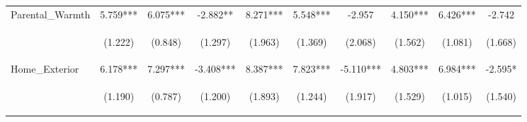 \begin{tabular}{lccccccccc}
\noalign{\smallskip}Parental_Warmth & 5.759*** & 6.075*** & -2.882** & 8.271*** & 5.548*** & -2.957 & 4.150*** & 6.426*** & -2.742\\
 & \begin{footnotesize}(1.222)\end{footnotesize} & \begin{footnotesize}(0.848)\end{footnotesize} & \begin{footnotesize}(1.297)\end{footnotesize} & \begin{footnotesize}(1.963)\end{footnotesize} & \begin{footnotesize}(1.369)\end{footnotesize} & \begin{footnotesize}(2.068)\end{footnotesize} & \begin{footnotesize}(1.562)\end{footnotesize} & \begin{footnotesize}(1.081)\end{footnotesize} & \begin{footnotesize}(1.668)\end{footnotesize}\\
\noalign{\smallskip}Home_Exterior & 6.178*** & 7.297*** & -3.408*** & 8.387*** & 7.823*** & -5.110*** & 4.803*** & 6.984*** & -2.595*\\
 & \begin{footnotesize}(1.190)\end{footnotesize} & \begin{footnotesize}(0.787)\end{footnotesize} & \begin{footnotesize}(1.200)\end{footnotesize} & \begin{footnotesize}(1.893)\end{footnotesize} & \begin{footnotesize}(1.244)\end{footnotesize} & \begin{footnotesize}(1.917)\end{footnotesize} & \begin{footnotesize}(1.529)\end{footnotesize} & \begin{footnotesize}(1.015)\end{footnotesize} & \begin{footnotesize}(1.540)\end{footnotesize}\\

\end{tabular}
